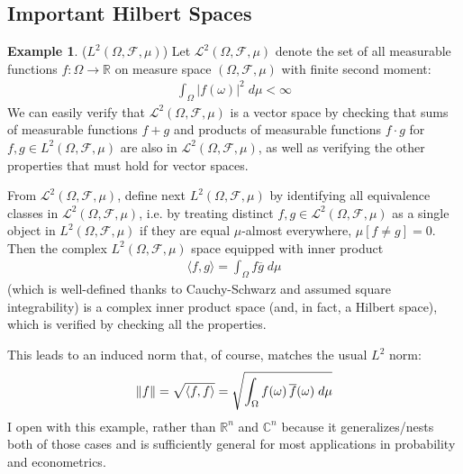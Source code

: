 \documentclass[12pt]{book}
\numberwithin{equation}{section} %
\theoremstyle{plain}
\theoremstyle{definition}
\newtheorem{ex}[thm]{Example}
\theoremstyle{remark}
\newcommand{\ra}{\rightarrow}
\newcommand{\sF}{\mathscr{F}}
\newcommand{\sL}{\mathscr{L}}
\newcommand{\R}{\mathbb{R}}
\newcommand{\C}{\mathbb{C}}
\begin{document}
\clearpage
\subsection{Important Hilbert Spaces}

\begin{ex}($L^2(\Omega,\sF,\mu)$)
Let $\sL^2(\Omega,\sF,\mu)$ denote the set of all
measurable functions $f:\Omega\ra \R$ on measure space
$(\Omega,\sF,\mu)$ with finite second moment:
\begin{align*}
  \int_\Omega |f(\omega)|^2 \; d\mu <\infty
\end{align*}
We can easily verify that $\sL^2(\Omega,\sF,\mu)$ is a vector space by
checking that sums of measurable functions $f+g$ and products of
measurable functions $f\cdot g$ for $f,g\in L^2(\Omega,\sF,\mu)$ are
also in $\sL^2(\Omega,\sF,\mu)$, as well as verifying the other
properties that must hold for vector spaces.

From $\sL^2(\Omega,\sF,\mu)$, define next $L^2(\Omega,\sF,\mu)$ by
identifying all equivalence classes in $\sL^2(\Omega,\sF,\mu)$, i.e. by
treating distinct $f,g\in\sL^2(\Omega,\sF,\mu)$ as a single
object in $L^2(\Omega,\sF,\mu)$ if they are equal $\mu$-almost everywhere,
$\mu[f\neq g]=0$.
Then the complex $L^2(\Omega,\sF,\mu)$ space equipped with inner product
\begin{align*}
  \langle f,g \rangle
  = \int_\Omega f\overline{g} \; d\mu
\end{align*}
(which is well-defined thanks to Cauchy-Schwarz and assumed square
integrability)
is a complex inner product space (and, in fact, a Hilbert space), which
is verified by checking all the properties.

This leads to an induced norm that, of course, matches the usual $L^2$
norm:
\begin{align*}
  \lVert
  f
  \rVert
  =
  \sqrt{\langle f,f\rangle}
  =
  \sqrt{%
    \int_{\Omega} f(\omega)\,\overline{f}(\omega)\;d\mu
  }
\end{align*}
I open with this example, rather than $\R^n$ and $\C^n$ because it
generalizes/nests both of those cases and is sufficiently general for
most applications in probability and econometrics.
\end{ex}
\end{document}
